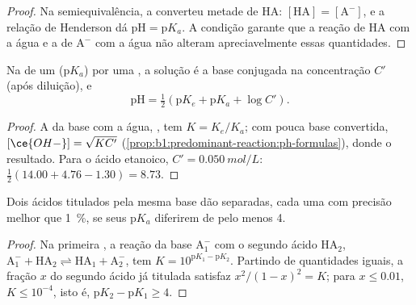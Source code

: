 \begin{proof}
Na semiequivalência, a  
converteu metade de HA: $[\mathrm{HA}] = [\mathrm{A^-}]$, e a relação de
Henderson dá $\mathrm{pH} = \mathrm{p}K_a$. A condição garante que a
reação de HA com a água e a de $\mathrm{A^-}$ com a água não alteram
apreciavelmente essas quantidades.
\end{proof}

\begin{proposition}\label{prop:b1:titration-methods:ph-at-equivalence}
Na  de um  ($\mathrm{p}K_a$) por uma , a
solução é a base conjugada na concentração $C'$ (após diluição), e
\[
  \mathrm{pH} = \tfrac12(\mathrm{p}K_e + \mathrm{p}K_a + \log C') .
\]
\end{proposition}

\begin{proof}
A  da base com a água,
, tem $K = K_e/K_a$; com pouca base
convertida, $[\ce{OH-}] = \sqrt{KC'}$ (\cref{prop:b1:predominant-reaction:ph-formulas}),
donde o resultado. Para o ácido etanoico, $C' = \qty{0.050}{mol/L}$:
$\frac12(14.00 + 4.76 - 1.30) = 8.73$.
\end{proof}

\begin{proposition}\label{prop:b1:titration-methods:successive}
Dois ácidos titulados pela mesma base dão  separadas, cada
uma com precisão melhor que \qty{1}{\percent}, se seus $\mathrm{p}K_a$
diferirem de pelo menos 4.
\end{proposition}

\begin{proof}
Na primeira , a reação da base $\mathrm{A_1^-}$ com o
segundo ácido $\mathrm{HA_2}$, $\mathrm{A_1^-} + \mathrm{HA_2}
\rightleftharpoons \mathrm{HA_1} + \mathrm{A_2^-}$, tem $K = 10^{\mathrm{p}K_1 - \mathrm{p}K_2}$.
Partindo de quantidades iguais, a fração $x$ do segundo ácido já
titulada satisfaz $x^2/(1 - x)^2 = K$; para $x \leqslant 0.01$, $K
\leqslant 10^{-4}$, isto é, $\mathrm{p}K_2 - \mathrm{p}K_1 \geqslant 4$.
\end{proof}

